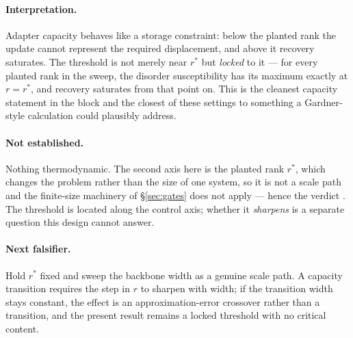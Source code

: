 \paragraph{Interpretation.} Adapter capacity behaves like a storage constraint:
below the planted rank the update cannot represent the required displacement,
and above it recovery saturates. The threshold is not merely near $r^\ast$ but
\emph{locked} to it --- for every planted rank in the sweep, the disorder
susceptibility has its maximum exactly at $r=r^\ast$, and recovery saturates
from that point on. This is the cleanest capacity statement in the block and
the closest of these settings to something a Gardner-style calculation could
plausibly address.

\paragraph{Not established.} Nothing thermodynamic. The second axis here is the
planted rank $r^\ast$, which changes the problem rather than the size of one
system, so it is not a scale path and the finite-size machinery of
\S\ref{sec:gates} does not apply --- hence the verdict
\emph{\AtlasLoraRankVerdict{}}. The threshold is located along the control
axis; whether it \emph{sharpens} is a separate question this design cannot
answer.

\paragraph{Next falsifier.} Hold $r^\ast$ fixed and sweep the backbone width as
a genuine scale path. A capacity transition requires the step in $r$ to sharpen
with width; if the transition width stays constant, the effect is an
approximation-error crossover rather than a transition, and the present result
remains a locked threshold with no critical content.
